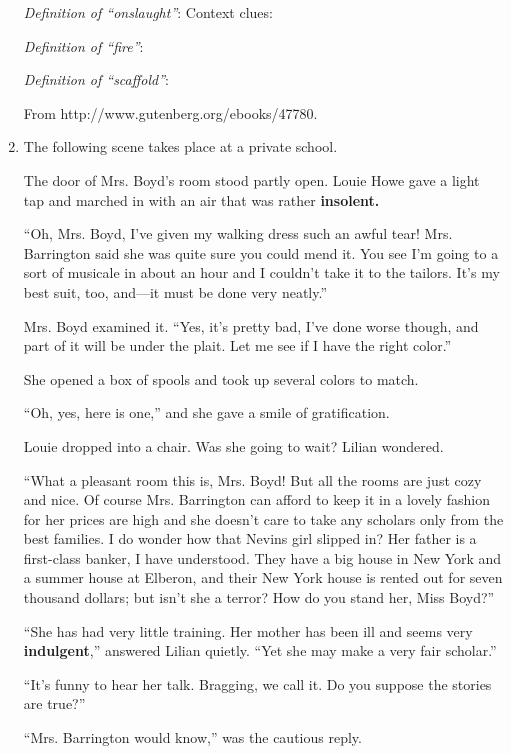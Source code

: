 \begin{enumerate}
\textit{Definition of ``onslaught''}: \hrulefill
Context clues: \hrulefill

\textit{Definition of ``fire''}: \hrulefill
\noindent\makebox[\linewidth]{\rule{\paperwidth}{0.4pt}}

\textit{Definition of ``scaffold''}: \hrulefill
\noindent\makebox[\linewidth]{\rule{\paperwidth}{0.4pt}}

From http://www.gutenberg.org/ebooks/47780. 

\item The following scene takes place at a private school.

The door of Mrs. Boyd’s room stood partly open. Louie Howe gave a light tap and marched in with an air that was rather \textbf{insolent.}

``Oh, Mrs. Boyd, I’ve given my walking dress such an awful tear! Mrs. Barrington said she was quite sure you could mend it. You see I’m going to a sort of musicale in about an hour and I couldn’t take it to the tailors. It’s my best suit, too, and—it must be done very neatly.''

Mrs. Boyd examined it. ``Yes, it’s pretty bad, I’ve done worse though, and part of it will be under the plait. Let me see if I have the right color.''

She opened a box of spools and took up several colors to match.

``Oh, yes, here is one,'' and she gave a smile of gratification.

Louie dropped into a chair. Was she going to wait? Lilian wondered.

``What a pleasant room this is, Mrs. Boyd! But all the rooms are just cozy and nice. Of course Mrs. Barrington can afford to keep it in a lovely fashion for her prices are high and she doesn’t care to take any scholars only from the best families. I do wonder how that Nevins girl slipped in? Her father is a first-class banker, I have understood. They have a big house in New York and a summer house at Elberon, and their New York house is rented out for seven thousand dollars; but isn’t she a terror? How do you stand her, Miss Boyd?''

``She has had very little training. Her mother has been ill and seems very \textbf{indulgent},'' answered Lilian quietly. ``Yet she may make a very fair scholar.''

``It’s funny to hear her talk. Bragging, we call it. Do you suppose the stories are true?''

``Mrs. Barrington would know,'' was the cautious reply.


\end{enumerate}
